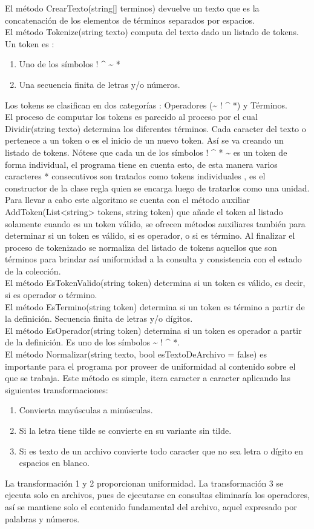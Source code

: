 \documentclass{article}
\begin{document}
El método CrearTexto(string[] terminos) devuelve un texto que es la concatenación de los elementos de términos separados por espacios.\\
El método Tokenize(string texto) computa del texto dado un listado de tokens. Un token es :\\
\begin{enumerate}
  \item Uno de los símbolos ! \^{} \~{} *
	\item Una secuencia finita de letras y/o números.
\end{enumerate}
Los tokens se clasifican en dos categorías : Operadores (\~{} ! \^{} *) y Términos.\\
El proceso de computar los tokens es parecido al proceso por el cual Dividir(string texto) determina los diferentes términos. Cada caracter del texto o pertenece a un token o es el inicio de un nuevo token. Así se va creando un listado de tokens. Nótese que cada un de los símbolos ! \^{} * \~{} es un token de forma individual, el programa tiene en cuenta esto, de esta manera varios caracteres * consecutivos son tratados como tokens individuales , es el constructor de la clase regla quien se encarga luego de tratarlos como una unidad. Para llevar a cabo este algoritmo se cuenta con el método auxiliar AddToken(List<string> tokens, string token) que añade el token al listado solamente cuando es un token válido, se ofrecen métodos auxiliares también para determinar si un token es válido, si es operador, o si es término. Al finalizar el proceso de tokenizado se normaliza del listado de tokens aquellos que son términos para brindar así uniformidad a la consulta y consistencia con el estado de la colección.\\
El método EsTokenValido(string token) determina si un token es válido, es decir, si es operador o término.\\
El método EsTermino(string token) determina si un token es término a partir de la definición. Secuencia finita de letras y/o dígitos.\\
El método EsOperador(string token) determina si un token es operador a partir de la definición. Es uno de los símbolos \~{} ! \^{} *.\\
El método Normalizar(string texto, bool esTextoDeArchivo = false) es importante para el programa por proveer de uniformidad al contenido sobre el que se trabaja. Este método es simple, itera caracter a caracter aplicando las siguientes transformaciones:\\
\begin{enumerate}
  \item Convierta mayúsculas a minúsculas.
	\item Si la letra tiene tilde se convierte en su variante sin tilde.
	\item Si es texto de un archivo convierte todo caracter que no sea letra o dígito en espacios en 	blanco.
\end{enumerate}
La transformación 1 y 2 proporcionan uniformidad. La transformación 3 se ejecuta solo en archivos, pues de ejecutarse en consultas eliminaría los operadores, así se mantiene solo el contenido fundamental del archivo, aquel expresado por palabras y números.\\
\end{document}
